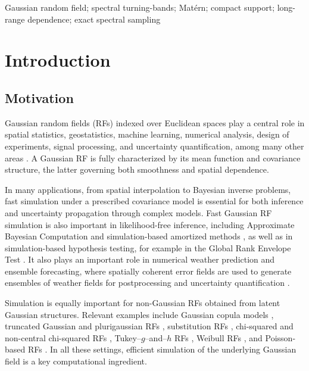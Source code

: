 \documentclass[
  12pt]{article}
\begin{document}
\noindent%


 Gaussian random field; spectral turning-bands; Mat\'ern; compact support; long-range dependence; exact spectral sampling
\vfill

\newpage
{} %



\section{Introduction}

\subsection{Motivation}

Gaussian random fields (RFs) indexed over Euclidean spaces play a central role in spatial statistics, geostatistics, machine learning, numerical analysis, design of experiments, signal processing, and uncertainty quantification, among many other areas
\citep{Cressie:1993,stein-book,Banerjee-Carlin-Gelfand:2004,williams2006gaussian,wendland2004scattered,cp2003}.
A Gaussian RF is fully characterized by its mean function and covariance structure, the latter governing both smoothness and spatial dependence.

In many applications, from spatial interpolation to Bayesian inverse problems, fast simulation under a prescribed covariance model is essential for both inference and uncertainty propagation through complex models.
Fast Gaussian RF simulation is also important in likelihood-free inference, including Approximate Bayesian Computation \citep{sisson2018handbook} and simulation-based amortized methods \citep{zammit2025neural}, as well as in simulation-based hypothesis testing, for example in the Global Rank Envelope Test \citep{globale}.
It also plays an important role in numerical weather prediction and ensemble forecasting, where spatially coherent error fields are used to generate ensembles of weather fields for postprocessing and uncertainty quantification \citep{BerrocalRafteryGneiting2007}.

Simulation is equally important for non-Gaussian RFs obtained from latent Gaussian structures.
Relevant examples include Gaussian copula models \citep{MasarottoVarin2012}, truncated Gaussian and plurigaussian RFs \citep{armstrong2011plurigaussian}, substitution RFs \citep{emery2008substitution}, chi-squared and non-central chi-squared RFs \citep{Adler:1981,emery2007}, Tukey--$g$--and--$h$ RFs \citep{XuGenton2017}, Weibull RFs \citep{Bevilacqua2020}, and Poisson-based RFs \citep{MoralesNavarrete2024}.
In all these settings, efficient simulation of the underlying Gaussian field is a key computational ingredient.
\end{document}
